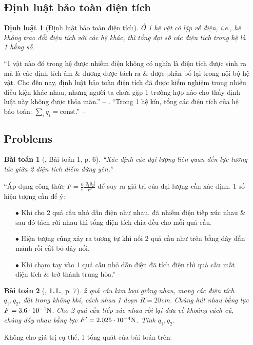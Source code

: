 \documentclass[oneside]{book}
\numberwithin{equation}{section}
\newtheorem{dinhluat}{Định luật}[section]
\newtheorem{baitoan}{Bài toán}[section]
\begin{document}
\subsection{Định luật bảo toàn điện tích}

\begin{dinhluat}[Định luật bảo toàn điện tích]
	\label{dinh luat: bao toan dien tich}
	Ở 1 hệ vật cô lập về điện, i.e., hệ không trao đổi điện tích với các hệ khác, thì tổng đại số các điện tích trong hệ là 1 hằng số.
\end{dinhluat}
``1 vật nào đó trong hệ được nhiễm điện không có nghĩa là điện tích được sinh ra mà là các định tích âm \& dương được tách ra \& được phân bố lại trong nội bộ hệ vật. Cho đến nay, định luật bảo toàn điện tích đã được kiểm nghiệm trong nhiều điều kiện khác nhau, nhưng người ta chưa gặp 1 trường hợp nào cho thấy định luật này không được thỏa mãn.'' -- \cite[p. 12]{SGK_Vat_Ly_11_nang_cao}. ``Trong 1 hệ kín, tổng các điện tích của hệ bảo toàn: $\sum_i q_i = \mbox{const}$.'' -- \cite[p. 5]{Giai_Toan_Vat_Ly_11_tap_1}

\subsection{Problems}

\begin{baitoan}[\cite{Giai_Toan_Vat_Ly_11_tap_1}, Bài toán 1, p. 6]
	``Xác định các đại lượng liên quan đến lực tương tác giữa 2 điện tích điểm đứng yên.''
\end{baitoan}
``Áp dụng công thức $F = \frac{k}{\varepsilon}\frac{|q_1q_2|}{r^2}$ để suy ra giá trị của đại lượng cần xác định. 1 số hiện tượng cần để ý:
\begin{enumerate}
	\item[$\bullet$] Khi cho 2 quả cầu nhỏ dẫn điện như nhau, đã nhiễm điện tiếp xúc nhau \& sau đó tách rời nhau thì tổng điện tích chia đều cho mỗi quả cầu.
	\item[$\bullet$] Hiện tượng cũng xảy ra tương tự khi nối 2 quả cầu như trên bằng dây dẫn mảnh rồi cắt bỏ dây nối.
	\item[$\bullet$] Khi chạm tay vào 1 quả cầu nhỏ dẫn điện đã tích điện thì quả cầu mất điện tích \& trở thành trung hòa.'' -- \cite[p. 7]{Giai_Toan_Vat_Ly_11_tap_1}
\end{enumerate}

\begin{baitoan}[\cite{Giai_Toan_Vat_Ly_11_tap_1}, \textbf{1.1.}, p. 7]
	2 quả cầu kim loại giống nhau, mang các điện tích $q_1,q_2$, đặt trong không khí, cách nhau 1 đoạn $R = 20$cm. Chúng hút nhau bằng lực $F = 3.6\cdot 10^{-4}{\rm N}$. Cho 2 quả cầu tiếp xúc nhau rồi lại đưa về khoảng cách cũ, chúng đẩy nhau bằng lực $F' = 2.025\cdot 10^{-4}{\rm N}$. Tính $q_1,q_2$.
\end{baitoan}
Không cho giá trị cụ thể, 1 tổng quát của bài toán trên:
\end{document}
